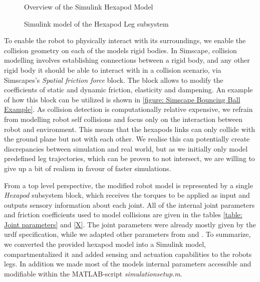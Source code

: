 \begin{figure}[h]
	\centerline{}
	\caption{Overview of the Simulink Hexapod Model}
	\label{figure: Hexapod Model Overview}
\end{figure}

\begin{figure}
	\centerline{}
	\caption{Simulink model of the Hexapod Leg subsystem}
	\label{figure: Hexapod Leg}
\end{figure}

To enable the robot to physically interact with its surroundings, we enable the collision geometry on each of the models rigid bodies.
In Simscape, collision modelling involves establishing connections between a rigid body, and any other rigid body it should be able to interact with in a collision scenario, via Simscapes's \textit{Spatial friction force} block.
The block allows to modify the coefficients of static and dynamic friction, elasticity and dampening.
An example of how this block can be utilized is shown in \ref{figure: Simscape Bouncing Ball Example}.
As collision detection is computationally relative expensive, we refrain from modelling robot self collisions and focus only on the interaction between robot and environment.
This means that the hexapods links can only collide with the ground plane but not with each other.
We realise this can potentially create discrepancies between simulation and real world, but as we initially only model predefined leg trajectories, which can be proven to not intersect, we are willing to give up a bit of realism in favour of faster simulations.

From a top level perspective, the modified robot model is represented by a single \textit{Hexapod} subsystem block, which receives the torques to be applied as input and outputs sensory information about each joint.
All of the internal joint parameters and friction coefficients used to model collisions are given in the tables \ref{table: Joint parameters} and \ref{X}.
The joint parameters were already mostly given by the urdf specification, while we adapted other parameters from \parencite{AUTHOR} and \parencite{AUTHOR2}.
To summarize, we converted the provided hexapod model into a Simulink model, compartmentalized it and added sensing and actuation capabilities to the robots legs.
In addition we made most of the models internal parameters accessible and modifiable within the MATLAB-script \textit{simulationsetup.m}.



